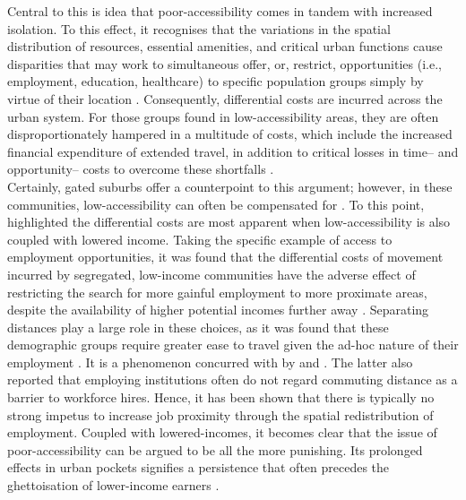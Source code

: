 Central to this is idea that poor-accessibility comes in tandem with increased isolation. To this effect, it recognises that the variations in the spatial distribution of resources, essential amenities, and critical urban functions cause disparities that may work to simultaneous offer, or, restrict, opportunities (i.e., employment, education, healthcare) to specific population groups simply by virtue of their location \citep{davidson1995accessibility, ewing2002measuring,curl2011does,ewing2016does}. Consequently, differential costs are incurred across the urban system. For those groups found in low-accessibility areas, they are often disproportionately hampered in a multitude of costs, which include the increased financial expenditure of extended travel, in addition to critical losses in time-- and opportunity-- costs to overcome these shortfalls \citep{cutler1997ghettos,alesina1999public,alesina2000participation,charles2003dynamics,sanchez2011subjective}. \\

Certainly, gated suburbs offer a counterpoint to this argument; however, in these communities, low-accessibility can often be compensated for \citep{mantey2017social}. To this point, \cite{wasmer2002does} highlighted the differential costs are most apparent when low-accessibility is also coupled with lowered income. Taking the specific example of access to employment opportunities, it was found that the differential costs of movement incurred by segregated, low-income communities have the adverse effect of restricting the search for more gainful employment to more proximate areas, despite the availability of higher potential incomes further away \citep{wasmer2002does}. Separating distances play a large role in these choices, as it was found that these demographic groups require greater ease to travel given the ad-hoc nature of their employment \citep{wasmer2002does}. It is a phenomenon concurred with by \cite{stoll1999spatial} and \cite{giuliano1993journey}. The latter also reported that employing institutions often do not regard commuting distance as a barrier to workforce hires. Hence, it has been shown that there is typically no strong impetus to increase job proximity through the spatial redistribution of employment. Coupled with lowered-incomes, it becomes clear that the issue of poor-accessibility can be argued to be all the more punishing. Its prolonged effects in urban pockets signifies a persistence that often precedes the ghettoisation of lower-income earners \citep{cutler1997ghettos,de2013explaining}.\\

